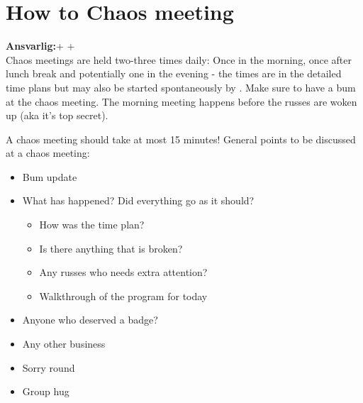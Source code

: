 \documentclass[../../main.tex]{subfiles}
\begin{document}
\section{How to Chaos meeting}
\textbf{Ansvarlig:}\DAGS + \ALLV + \KABS\\

Chaos meetings are held two-three times daily: Once in the morning, once after lunch break and potentially one in the evening - the times are in the detailed time plans but may also be started spontaneously by \DAGS. Make sure to have a bum at the chaos meeting. The morning meeting happens before the russes are woken up (aka it's top secret). 

A chaos meeting should take at most 15 minutes! General points to be discussed at a chaos meeting:
\begin{itemize}
    \item Bum update
    \item What has happened? Did everything go as it should?
    \begin{itemize}
        \item How was the time plan?
        \item Is there anything that is broken?
        \item Any russes who needs extra attention?
        \item Walkthrough of the program for today
    \end{itemize}
    \item Anyone who deserved a badge?
    \item Any other business
    \item Sorry round
    \item Group hug
\end{itemize}
\end{document}
